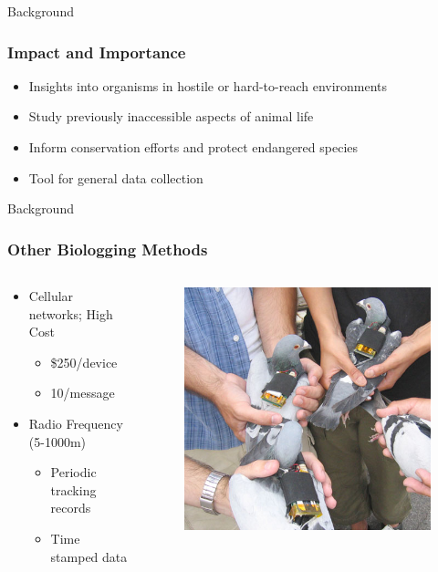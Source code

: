 \documentclass{beamer}
\begin{document}
\begin{frame}{Background}
  \frametitle{Impact and Importance}
        \begin{itemize}
          \item Insights into organisms in hostile or hard-to-reach environments
          \item Study previously inaccessible aspects of animal life
          \item Inform conservation efforts and protect endangered species
          \item Tool for general data collection
        \end{itemize}
\end{frame}

\begin{frame}{Background}
  \frametitle{Other Biologging Methods}
  \begin{columns}
    \begin{column}{0.5\textwidth}
        \begin{itemize}
          \item Cellular networks; High Cost
          \begin{itemize}
            \item \$250/device
            \item 10\textcent/message
          \end{itemize}
          \item Radio Frequency (5-1000m)
          \begin{itemize}
            \item Periodic tracking records
            \item Time stamped data
          \end{itemize}
        \end{itemize}
      \end{column}
      \begin{column}{.5\textwidth}
        \begin{figure}[htbp]
          \centering
          \includegraphics[width=\textwidth]{PigeonCellular.jpg}

\end{figure}
\end{column}
\end{columns}
\end{frame}
\end{document}
